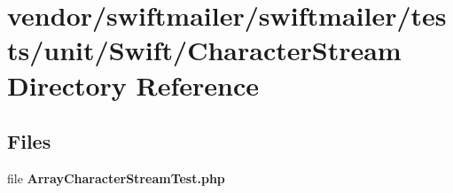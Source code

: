 \section{vendor/swiftmailer/swiftmailer/tests/unit/\+Swift/\+Character\+Stream Directory Reference}
\label{dir_efb32f6d52a7eaa1e4cc6cbc7406fb63}
\subsection*{Files}
\begin{DoxyCompactItemize}
\item 
file {\bf Array\+Character\+Stream\+Test.\+php}
\end{DoxyCompactItemize}
